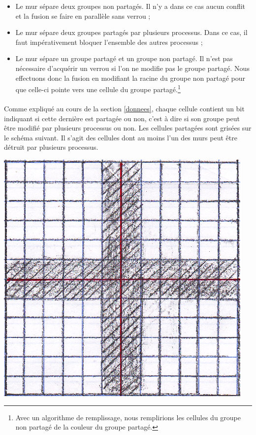 \documentclass[a4paper,french]{article}
\begin{document}
    \begin{itemize}
        \item Le mur sépare deux groupes non partagés. Il n'y a dans ce cas
aucun conflit et la fusion se faire en parallèle sans verrou ;
        \item Le mur sépare deux groupes partagés par plusieurs processus.
Dans ce cas, il faut impérativement bloquer l'ensemble des autres processus ;
        \item Le mur sépare un groupe partagé et un groupe non partagé. Il n'est
pas nécessaire d'acquérir un verrou si l'on ne modifie pas le groupe partagé.
Nous effectuons donc la fusion en modifiant la racine du groupe non partagé pour
que celle-ci pointe vers une cellule du groupe partagé.\footnote{Avec un
algorithme de remplissage, nous remplirions les cellules du groupe non partagé
de la couleur du groupe partagé.}
    \end{itemize}

    \paragraph{} Comme expliqué au cours de la section \ref{donnees}, chaque
cellule contient un bit indiquant si cette dernière est partagée ou non, c'est à
dire si son groupe peut être modifié par plusieurs processus ou non.
    \newline Les cellules partagées sont grisées sur le schéma suivant. Il
s'agit des cellules dont au moins l'un des murs peut être détruit par plusieurs
processus.

    \begin{center}
        \includegraphics{schema_partages.eps}
    \end{center}
\end{document}

